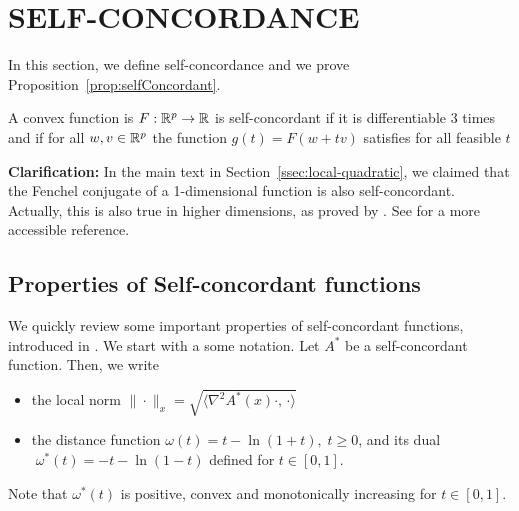 \documentclass[twoside]{article}
\begin{document}
\section{SELF-CONCORDANCE}
\label{app:self-concordant}

In this section, we define self-concordance and we prove Proposition~\ref{prop:selfConcordant}.

\begin{definition}
\label{def:self-concordance}
A convex function is $F:\mathbb{R}^p \rightarrow \mathbb{R}$ is self-concordant if it is differentiable $3$ times and if for all $w, v \in\mathbb{R}^p$ the function $g(t) = F(w+tv)$ satisfies for all feasible $t$
\end{definition}


{\bf Clarification:} In the main text in Section~\ref{ssec:local-quadratic}, we claimed that the Fenchel conjugate of a 1-dimensional function is also self-concordant. 
Actually, this is also true in higher dimensions, as proved by \citet{nesterov1994interior}. See \citet[Prop.~6]{sun2019generalized} for a more accessible reference.


\subsection{Properties of Self-concordant functions}

We quickly review some important properties of self-concordant functions, introduced in \citep{nesterov2003introductory}. We start with a some notation. Let $A^*$ be a self-concordant function. Then, we write
\begin{itemize}
	\item the local norm $\|\cdot\|_x = \sqrt{ \langle \nabla^2A^*(x)\cdot,\, \cdot \rangle }$ 
	\item the distance function $\omega(t) = t-\ln (1+t),\;t\geq 0$, and its dual $\;\omega^*(t) = -t-\ln(1-t)$ defined for $t\in [0,1]$.
\end{itemize}
Note that $\omega^*(t)$ is positive, convex and monotonically increasing for $t\in[0,1]$.
\end{document}
